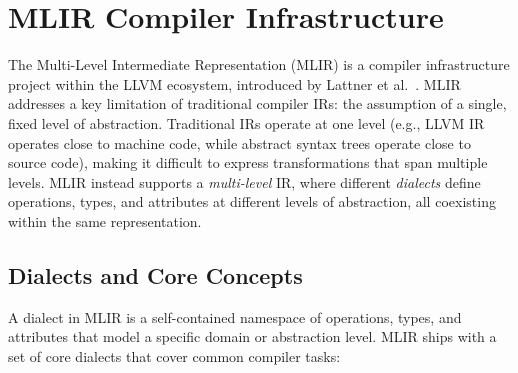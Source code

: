 \section{MLIR Compiler Infrastructure}

The Multi-Level Intermediate Representation (MLIR) is a compiler infrastructure project within the LLVM ecosystem, introduced by Lattner et al.~\cite{lattner2021mlir}. MLIR addresses a key limitation of traditional compiler IRs: the assumption of a single, fixed level of abstraction. Traditional IRs operate at one level (e.g., LLVM IR operates close to machine code, while abstract syntax trees operate close to source code), making it difficult to express transformations that span multiple levels. MLIR instead supports a \textit{multi-level} IR, where different \textit{dialects} define operations, types, and attributes at different levels of abstraction, all coexisting within the same representation.

\subsection{Dialects and Core Concepts}

A dialect in MLIR is a self-contained namespace of operations, types, and attributes that model a specific domain or abstraction level. MLIR ships with a set of core dialects that cover common compiler tasks:

